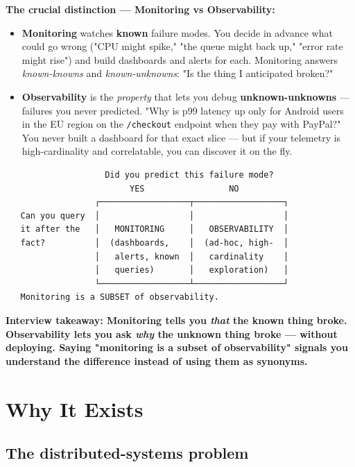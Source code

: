 \documentclass[11pt]{article}
\providecommand{\tightlist}{\setlength{\itemsep}{1pt}\setlength{\parskip}{0pt}}
\begin{document}
\textbf{The crucial distinction --- Monitoring vs Observability:}

\begin{itemize}
\tightlist
\item
  \textbf{Monitoring} watches \textbf{known} failure modes. You decide in advance what could go wrong ("CPU might spike," "the queue might back up," "error rate might rise") and build dashboards and alerts for each. Monitoring answers \emph{known-knowns} and \emph{known-unknowns}: "Is the thing I anticipated broken?"
\item
  \textbf{Observability} is the \emph{property} that lets you debug \textbf{unknown-unknowns} --- failures you never predicted. "Why is p99 latency up only for Android users in the EU region on the \texttt{/checkout} endpoint when they pay with PayPal?" You never built a dashboard for that exact slice --- but if your telemetry is high-cardinality and correlatable, you can discover it on the fly.
\end{itemize}

\setcodelang{}

\begin{verbatim}
                    Did you predict this failure mode?
                         YES                 NO
                  ┌──────────────────┬──────────────────┐
   Can you query  │                  │                  │
   it after the   │   MONITORING     │   OBSERVABILITY  │
   fact?          │  (dashboards,    │  (ad-hoc, high-  │
                  │   alerts, known  │   cardinality    │
                  │   queries)       │   exploration)   │
                  └──────────────────┴──────────────────┘
   Monitoring is a SUBSET of observability.
\end{verbatim}

\textbf{Interview takeaway: Monitoring tells you \emph{that} the known thing broke. Observability lets you ask \emph{why} the unknown thing broke --- without deploying. Saying "monitoring is a subset of observability" signals you understand the difference instead of using them as synonyms.}

\section{Why It Exists}\label{why-it-exists}

\subsection{The distributed-systems problem}\label{the-distributed-systems-problem}
\end{document}
